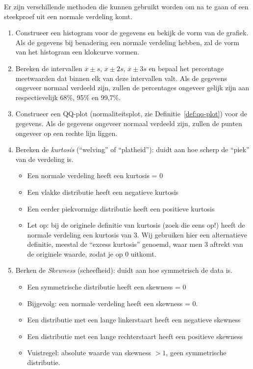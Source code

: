 {Er zijn verschillende methoden die kunnen gebruikt worden om na te gaan of een steekproef uit een normale verdeling komt.
\begin{enumerate}
  \item Construeer een histogram voor de gegevens en bekijk de vorm van de grafiek. Als de gegevens bij benadering een normale verdeling hebben, zal de vorm van het histogram een klokcurve vormen.
  \item Bereken de intervallen $\overline{x} \pm s$, $\overline{x} \pm 2s$, $\overline{x} \pm 3s$ en bepaal het percentage meetwaarden dat binnen elk van deze intervallen valt. Als de gegevens ongeveer normaal verdeeld zijn, zullen de percentages ongeveer gelijk zijn aan respectievelijk 68\%, 95\% en 99,7\%.
  \item Construeer een QQ-plot (normaliteitsplot, zie Definitie~\ref{def:qq-plot}) voor de gegevens. Als de gegevens ongeveer normaal verdeeld zijn, zullen de punten ongeveer op een rechte lijn liggen.
  \item Bereken de \emph{kurtosis} (``welving'' of ``platheid''): duidt aan hoe scherp de ``piek'' van de verdeling is.
    \begin{itemize}
      \item Een normale verdeling heeft een kurtosis = 0
      \item Een vlakke distributie heeft een negatieve kurtosis
      \item Een eerder piekvormige distributie heeft een positieve kurtosis
      \item Let op: bij de originele definitie van kurtosis (zoek die eens op!) heeft de normale verdeling een kurtosis van 3. Wij gebruiken hier een alternatieve definitie, meestal de ``excess kurtosis'' genoemd, waar men 3 aftrekt van de originele waarde, zodat je op 0 uitkomt.
    \end{itemize}
  \item Berken de \emph{Skewness} (scheefheid): duidt aan hoe symmetrisch de data is.
    \begin{itemize}
      \item Een symmetrische distributie heeft een skewness = 0
      \item Bijgevolg: een normale verdeling heeft een skewness = 0.
      \item Een distributie met een lange linkerstaart heeft een negatieve skewness
      \item Een distributie met een lange rechterstaart heeft een positieve skewness
      \item Vuistregel: absolute waarde van skewness $>1$, geen symmetrische distributie.
    \end{itemize}
\end{enumerate}

}
